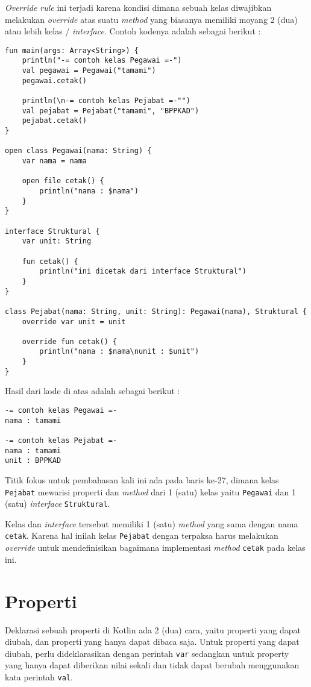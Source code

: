 \textit{Override rule} ini terjadi karena kondisi dimana sebuah kelas diwajibkan melakukan \textit{override} atas suatu \textit{method} yang biasanya memiliki moyang 2 (dua) atau lebih kelas / \textit{interface}. Contoh kodenya adalah sebagai berikut : 

\begin{lstlisting}
fun main(args: Array<String>) {
	println("-= contoh kelas Pegawai =-")
	val pegawai = Pegawai("tamami")
	pegawai.cetak()
	
	println(\n-= contoh kelas Pejabat =-"")
	val pejabat = Pejabat("tamami", "BPPKAD")
	pejabat.cetak()
}

open class Pegawai(nama: String) {
	var nama = nama
	
	open file cetak() {
		println("nama : $nama")
	}
}

interface Struktural {
	var unit: String
	
	fun cetak() {
		println("ini dicetak dari interface Struktural")
	}
}

class Pejabat(nama: String, unit: String): Pegawai(nama), Struktural {
	override var unit = unit
	
	override fun cetak() {
		println("nama : $nama\nunit : $unit")
	}
}
\end{lstlisting}

Hasil dari kode di atas adalah sebagai berikut :

\begin{lstlisting}
-= contoh kelas Pegawai =-
nama : tamami

-= contoh kelas Pejabat =-
nama : tamami
unit : BPPKAD
\end{lstlisting}

Titik fokus untuk pembahasan kali ini ada pada baris ke-27, dimana kelas \texttt{Pejabat} mewarisi properti dan \textit{method} dari 1 (satu) kelas yaitu \texttt{Pegawai} dan 1 (satu) \textit{interface} \texttt{Struktural}. 

Kelas dan \textit{interface} tersebut memiliki 1 (satu) \textit{method} yang sama dengan nama \texttt{cetak}. Karena hal inilah kelas \texttt{Pejabat} dengan terpaksa harus melakukan \textit{override} untuk mendefinisikan bagaimana implementasi \textit{method} \texttt{cetak} pada kelas ini.

\section{Properti}

Deklarasi sebuah properti di Kotlin ada 2 (dua) cara, yaitu properti yang dapat diubah, dan properti yang hanya dapat dibaca saja. Untuk properti yang dapat diubah, perlu dideklarasikan dengan perintah \texttt{var} sedangkan untuk property yang hanya dapat diberikan nilai sekali dan tidak dapat berubah menggunakan kata perintah \texttt{val}.

